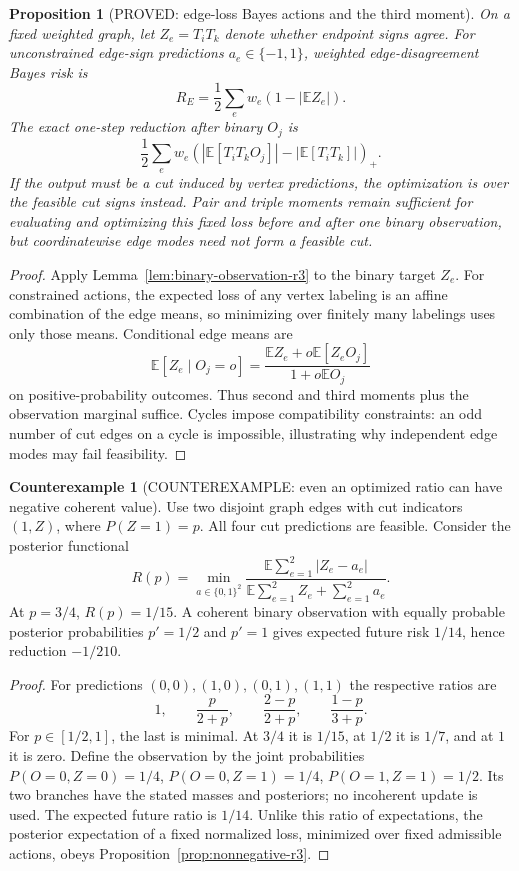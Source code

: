 \documentclass[11pt]{article}
\newtheorem{proposition}[theorem]{Proposition}
\theoremstyle{definition}
\newtheorem{counterexample}[theorem]{Counterexample}
\theoremstyle{remark}
\begin{document}
\begin{proposition}[PROVED: edge-loss Bayes actions and the third moment]
\label{prop:edge-moment-r3}
On a fixed weighted graph, let $Z_e=T_iT_k$ denote whether endpoint
signs agree. For unconstrained edge-sign predictions $a_e\in\{-1,1\}$,
weighted edge-disagreement Bayes risk is
\[
 R_E=\frac12\sum_e w_e(1-|\mathbb E Z_e|).
\]
The exact one-step reduction after binary $O_j$ is
\[
 \frac12\sum_e w_e
 (|\mathbb E[T_iT_kO_j]|-|\mathbb E[T_iT_k]|)_+.
\]
If the output must be a cut induced by vertex predictions, the
optimization is over the feasible cut signs instead. Pair and triple
moments remain sufficient for evaluating and optimizing this fixed
loss before and after one binary observation, but coordinatewise edge
modes need not form a feasible cut.
\end{proposition}
\begin{proof}
Apply Lemma~\ref{lem:binary-observation-r3} to the binary target $Z_e$.
For constrained actions, the expected loss of any vertex labeling is
an affine combination of the edge means, so minimizing over finitely
many labelings uses only those means. Conditional edge means are
\[
 \mathbb E[Z_e\mid O_j=o]
 =\frac{\mathbb E Z_e+o\mathbb E[Z_eO_j]}
        {1+o\mathbb E O_j}
\]
on positive-probability outcomes. Thus second and third moments plus
the observation marginal suffice. Cycles impose compatibility
constraints: an odd number of cut edges on a cycle is impossible,
illustrating why independent edge modes may fail feasibility.
\end{proof}

\begin{counterexample}[COUNTEREXAMPLE: even an optimized ratio can have negative coherent value]
\label{ce:optimized-ratio-r3}
Use two disjoint graph edges with cut indicators $(1,Z)$, where
$P(Z=1)=p$. All four cut predictions are feasible. Consider the
posterior functional
\[
 R(p)=\min_{a\in\{0,1\}^2}
 \frac{\mathbb E\sum_{e=1}^2|Z_e-a_e|}
      {\mathbb E\sum_{e=1}^2 Z_e+\sum_{e=1}^2a_e}.
\]
At $p=3/4$, $R(p)=1/15$. A coherent binary observation with equally
probable posterior probabilities $p'=1/2$ and $p'=1$ gives expected
future risk $1/14$, hence reduction $-1/210$.
\end{counterexample}
\begin{proof}
For predictions $(0,0),(1,0),(0,1),(1,1)$ the respective ratios are
\[
 1,\qquad \frac p{2+p},\qquad\frac{2-p}{2+p},
 \qquad\frac{1-p}{3+p}.
\]
For $p\in[1/2,1]$, the last is minimal. At $3/4$ it is $1/15$,
at $1/2$ it is $1/7$, and at $1$ it is zero.
Define the observation by the joint probabilities
$P(O=0,Z=0)=1/4$, $P(O=0,Z=1)=1/4$,
$P(O=1,Z=1)=1/2$. Its two branches have the stated masses and
posteriors; no incoherent update is used. The expected future ratio
is $1/14$. Unlike this ratio of expectations, the posterior expectation
of a fixed normalized loss, minimized over fixed admissible actions,
obeys Proposition~\ref{prop:nonnegative-r3}.
\end{proof}
\end{document}
